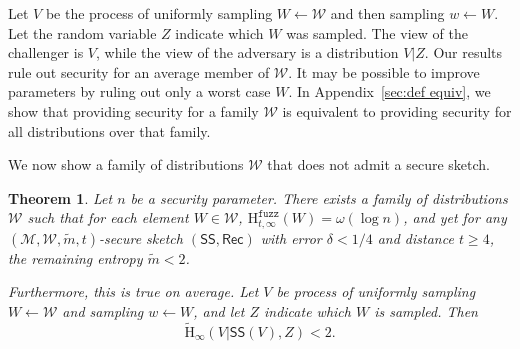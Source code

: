 \documentclass[11pt]{article}
\newcommand{\apref}[1]{\mbox{Appendix~\ref{#1}}}
\newcommand{\class}[1]{{\ensuremath{\mathsf{#1}}}}
\newcommand{\sketch}{\ensuremath{\class{SS}}\xspace}
\newcommand{\rec}{\ensuremath{\class{Rec}}\xspace}
\newcommand{\Hav}{\tilde{\mathrm{H}}_\infty}
\newcommand{\Hfuzz}{\mathrm{H}^{\mathtt{fuzz}}_{t,\infty}}
\newtheorem{theorem}{Theorem}[section]
\begin{document}
Let $V$ be the process of uniformly sampling $W\leftarrow \mathcal{W}$ and then sampling $w\leftarrow W$.  Let the random variable $Z$ indicate which $W$ was sampled.  The view of the challenger is $V$, while the view of the adversary is a distribution $V|Z$.  Our results rule out security for an average member of $\mathcal{W}$.  It may be possible to improve parameters by ruling out only a worst case $W$.  In \apref{sec:def equiv}, we show that providing security for a family $\mathcal{W}$ is equivalent to providing security for all distributions over that family.

We now show a family of distributions $\mathcal{W}$ that does not admit a secure sketch.  

\begin{theorem}
\label{thm:imposs sketch}
Let $n$ be a security parameter.  There exists a family of distributions $\mathcal{W}$ such that for each element $W\in \mathcal{W}$, $\Hfuzz(W)= \omega(\log n)$, and yet for any $(\mathcal{M}, \mathcal{W}, \tilde{m}, t)$-secure sketch $(\sketch, \rec)$ with error $\delta <1/4$ and distance $t\ge 4$, the remaining entropy $\tilde{m}<2$.  

Furthermore, this is true on average.  Let $V$ be process of uniformly sampling $W\leftarrow \mathcal{W}$ and sampling $w\leftarrow W$, and let $Z$ indicate which $W$ is sampled.  Then
\[
\Hav(V|\sketch(V), Z)< 2.
\]
\end{theorem}
\end{document}
